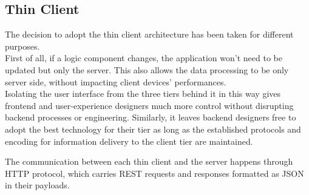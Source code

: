 \documentclass[../../../DD.tex]{subfiles}
\begin{document}
	
	\subsection{Thin Client\label{subsect:2.6.2}}
	The decision to adopt the thin client architecture has been taken for different purposes. \\
	First of all, if a logic component changes, the application won't need to be updated but only the server. This also allows the data processing to be only server side, without impacting client devices' performances. \\
	
	Isolating the user interface from the three tiers behind it in this way gives frontend and user‑experience designers much more control without disrupting backend processes or engineering. Similarly, it leaves backend designers free to adopt the best technology for their tier as long as the established protocols and encoding for information delivery to the client tier are maintained.
	
	The communication between each thin client and the server happens through HTTP protocol, which carries REST requests and responses formatted as JSON in their payloads.
\end{document}
